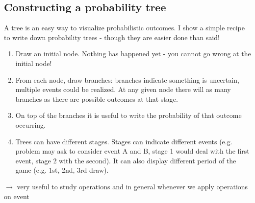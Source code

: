 \documentclass[12pt,twoside]{article}
\numberwithin{equation}{section}
\begin{document}
\subsection{Constructing a probability tree}
A tree is an easy way to visualize probabilistic outcomes. I show a simple recipe to write down probability trees - though they are easier done than said!
\begin{enumerate}
	\item Draw an initial node. Nothing has happened yet - you cannot go wrong at the initial node!\vspace*{-1em}
	\item From each node, draw branches: branches indicate something is uncertain, multiple events could be realized. At any given node there will as many branches as there are possible outcomes at that stage.\vspace*{-1em}
	\item On top of the branches it is useful to write the probability of that outcome occurring.\vspace*{-1em}
	\item Trees can have different stages. Stages can indicate different events (e.g. problem may ask to consider event A and B, stage 1 would deal with the first event, stage 2 with the second). It can also display different period of the game (e.g. 1st, 2nd, 3rd draw).
\end{enumerate}

\noindent $\bm{\longrightarrow}$ very useful to study operations and in general whenever we apply operations on event
\end{document}
